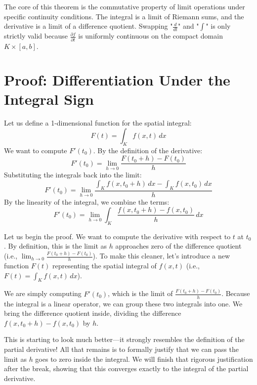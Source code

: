 \begin{redundant-explanation}
The core of this theorem is the commutative property of limit operations under specific continuity conditions. The integral is a limit of Riemann sums, and the derivative is a limit of a difference quotient. Swapping "$\frac{d}{dt}$" and "$\int$" is only strictly valid because $\frac{\partial f}{\partial t}$ is uniformly continuous on the compact domain $K \times [a,b]$.
\end{redundant-explanation}


\section{Proof: Differentiation Under the Integral Sign}

\begin{math-stroke}
Let us define a 1-dimensional function for the spatial integral:
\[
F(t) = \int_K f(x,t) \, dx
\]
We want to compute $F'(t_0)$. By the definition of the derivative:
\[
F'(t_0) = \lim_{h \to 0} \frac{F(t_0 + h) - F(t_0)}{h}
\]
Substituting the integrals back into the limit:
\[
F'(t_0) = \lim_{h \to 0} \frac{\int_K f(x, t_0 + h) \, dx - \int_K f(x, t_0) \, dx}{h}
\]
By the linearity of the integral, we combine the terms:
\[
F'(t_0) = \lim_{h \to 0} \int_K \frac{f(x, t_0 + h) - f(x, t_0)}{h} \, dx
\]
\end{math-stroke}

\begin{spoken-clean}[00:41:03 - 00:44:55]
Let us begin the proof. We want to compute the derivative with respect to $t$ at $t_0$. By definition, this is the limit as $h$ approaches zero of the difference quotient (i.e., $\lim_{h \to 0} \frac{F(t_0 + h) - F(t_0)}{h}$). To make this cleaner, let's introduce a new function $F(t)$ representing the spatial integral of $f(x,t)$ (i.e., $F(t) = \int_K f(x,t) \, dx$). 

We are simply computing $F'(t_0)$, which is the limit of $\frac{F(t_0 + h) - F(t_0)}{h}$. Because the integral is a linear operator, we can group these two integrals into one. We bring the difference quotient inside, dividing the difference $f(x, t_0 + h) - f(x, t_0)$ by $h$. 

This is starting to look much better—it strongly resembles the definition of the partial derivative! All that remains is to formally justify that we can pass the limit as $h$ goes to zero inside the integral. We will finish that rigorous justification after the break, showing that this converges exactly to the integral of the partial derivative.
\end{spoken-clean}
